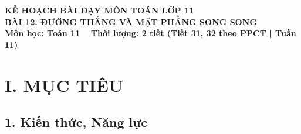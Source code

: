 \documentclass[12pt, a4paper]{article}
\begin{document}
\begin{center}
    {\fontsize{14pt}{17pt}\selectfont \textbf{KẾ HOẠCH BÀI DẠY MÔN TOÁN LỚP 11}}\\[6pt]
    {\fontsize{16pt}{19pt}\selectfont \textbf{BÀI 12. ĐƯỜNG THẲNG VÀ MẶT PHẲNG SONG SONG}}\\[4pt]
    {\fontsize{12pt}{15pt}\selectfont \textbf{Môn học: Toán 11} \ \textbar \ \textbf{Thời lượng: 2 tiết (Tiết 31, 32 theo PPCT | Tuần 11)}}
\end{center}

\vspace{5pt}

\section*{I. MỤC TIÊU}

\subsection*{1. Kiến thức, Năng lực}
\end{document}
